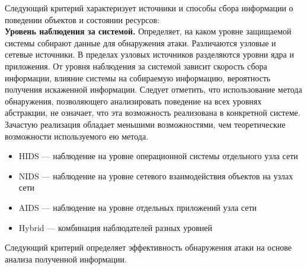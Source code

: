 Следующий критерий характеризует источники и способы сбора информации о поведении объектов и состоянии ресурсов:\\

\textbf{Уровень наблюдения за системой.} Определяет, на каком уровне защищаемой системы собирают данные для обнаружения атаки. Различаются узловые и сетевые источники. В пределах узловых источников разделяются уровни ядра и приложения. От уровня наблюдения за системой зависит скорость сбора информации, влияние системы на собираемую информацию, вероятность получения искаженной информации. Следует отметить, что использование метода обнаружения, позволяющего анализировать поведение на всех уровнях абстракции, не означает, что эта возможность реализована в конкретной системе. Зачастую реализация обладает меньшими возможностями, чем теоретические возможности используемого ею метода. 

\begin{itemize}

\item HIDS --- наблюдение на уровне операционной системы отдельного узла сети
\item NIDS --- наблюдение на уровне сетевого взаимодействия объектов на узлах сети
\item AIDS --- наблюдение на уровне отдельных приложений узла сети
\item Hybrid --- комбинация наблюдателей разных уровней

\end{itemize}

Следующий критерий определяет эффективность обнаружения атаки на основе анализа полученной информации.


